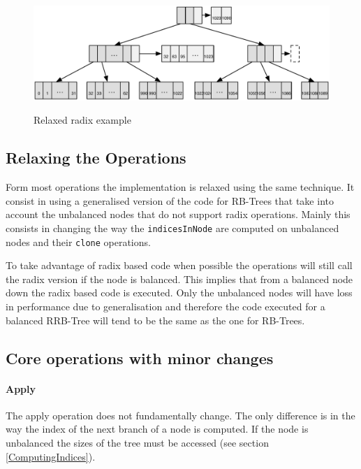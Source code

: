 \begin{figure}[h!]
  \centering
  \includegraphics[width=\textwidth]{Figures/Relaxed_radix_example}
  \label{Relaxed_radix_example}
  \caption{Relaxed radix example}
\end{figure}

\subsection{Relaxing the Operations}
Form most operations the implementation is relaxed using the same technique. It consist in using a generalised version of the code for RB-Trees that take into account the unbalanced nodes that do not support radix operations. Mainly this consists in changing the way the \texttt{indicesInNode} are computed on unbalanced nodes and their \texttt{clone} operations.
 
To take advantage of radix based code when possible the operations will still call the radix version if the node is balanced. This implies that from a balanced node down the radix based code is executed. Only the unbalanced nodes will have loss in performance due to generalisation and therefore the code executed for a balanced RRB-Tree will tend to be the same as the one for RB-Trees.
 
\subsection{Core operations with minor changes}

\paragraph{Apply}
The apply operation does not fundamentally change. The only difference is in the way the index of the next branch of a node is computed. If the node is unbalanced the sizes of the tree must be accessed (see section \ref{ComputingIndices}).



